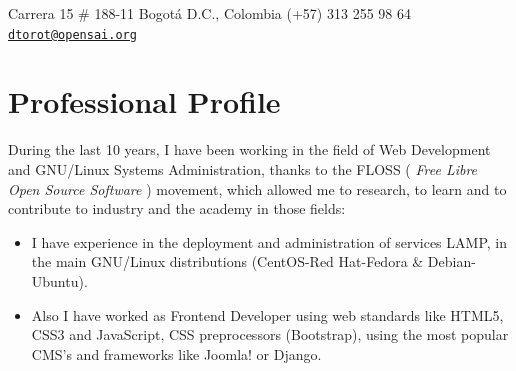 \documentclass[overlapped,line,final]{res}
\begin{document}

\begin{resume}


	\begin{minipage}{0.5\linewidth}
    		Carrera 15 \# 188-11  \newline 
    		Bogotá D.C., Colombia \newline
    		(+57) 313 255 98 64 \newline
		{\tt \href{mailto:dtorot@opensai.org}{dtorot@opensai.org}}
	\end{minipage}


\vspace{0.5cm}
\section{\sc Professional Profile}
\vspace{0.5cm}
During the last 10 years, I have been working in the field of Web Development and GNU/Linux Systems Administration, thanks to the FLOSS ( {\em Free Libre Open Source Software } ) movement, which allowed me to research, to learn and to contribute to industry and the academy in those fields:

\vspace{2mm}
\begin{itemize}
    \item I have experience in the deployment and administration of services LAMP, in the main GNU/Linux distributions (CentOS-Red Hat-Fedora \& Debian-Ubuntu). 

    \item Also I have worked as Frontend Developer using web standards like HTML5, CSS3 and JavaScript, CSS preprocessors (Bootstrap), using the most popular CMS's and frameworks like Joomla! or Django.


\end{itemize}
\end{resume}
\end{document}
